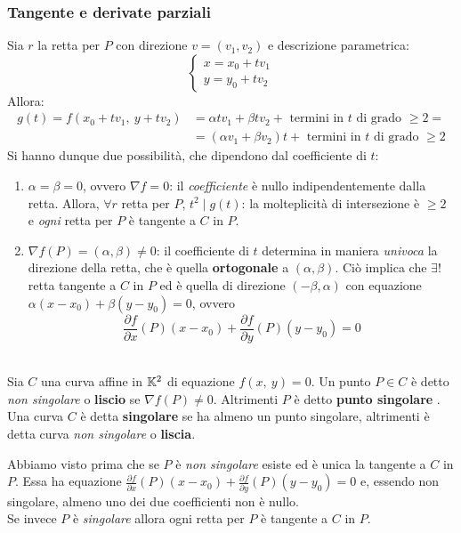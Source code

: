 \subsubsection{Tangente e derivate parziali}
Sia $r$ la retta per $P$ con direzione $v=(v_1,v_2)$ e descrizione parametrica:
\begin{equation*}
	\begin{cases}
		x=x_0+tv_1\\
		y=y_0+tv_2
	\end{cases}
\end{equation*}
Allora:
	\begin{equation*}
		\begin{array}{ll}
			g(t)=f(x_0+tv_1,\ y+tv_2)&=\alpha tv_1+\beta tv_2 + \text{ termini in }t\text{ di grado }\geq 2 =\\
			&= (\alpha v_1+\beta v_2)t + \text{ termini in }t \text{ di grado }\geq 2
		\end{array}	
	\end{equation*}
Si hanno dunque due possibilità, che dipendono dal coefficiente di $t$:
	\begin{enumerate}
		\item	$\alpha=\beta=0$, ovvero $\nabla f =0$: il \textit{coefficiente} è nullo indipendentemente dalla retta. Allora, $\forall r$ retta per $P$,  $t^2 \mid g(t)$: la molteplicità di intersezione è $\geq 2$ e \textit{ogni} retta per $P$ è tangente a $C$ in $P$.
		\item	$\nabla f\left(P\right)=(\alpha,\beta)\neq 0$:	il coefficiente di $t$ determina in maniera \textit{univoca} la direzione della retta, che è quella \textbf{ortogonale} a $(\alpha,\beta)$. Ciò implica che $\exists !$ retta tangente a $C$ in $P$ ed è quella di direzione $(-\beta,\alpha)$ con equazione	$\alpha(x-x_0)+\beta(y-y_0)=0$, ovvero
			\begin{equation}
				\frac{\partial{f}}{\partial{x}}\left(P\right)(x-x_0) + \frac{\partial{f}}{\partial{y}} \left(P\right)(y-y_0)=0
			\end{equation}
	\end{enumerate}
\begin{define}~{}\\
	Sia $C$ una curva affine in $\mathbb{K}^2$ di equazione $f\left(x,\ y\right)=0$. Un punto $P\in C$ è detto \textit{non singolare} o \textbf{liscio} se $\nabla f\left(P\right)\neq 0$. Altrimenti $P$ è detto \textbf{punto singolare} .\\
	Una curva $C$ è detta \textbf{singolare} se ha almeno un punto singolare, altrimenti è detta curva \textit{non singolare} o \textbf{liscia}.
\end{define}
Abbiamo visto prima che se $P$ è \textit{non singolare} esiste ed è unica la tangente a $C$ in $P$. Essa ha equazione	$\frac{\partial{f}}{\partial{x}}\left(P\right)(x-x_0) + \frac{\partial{f}}{\partial{y}} \left(P\right)(y-y_0)=0$ e, essendo non singolare, almeno uno dei due coefficienti non è nullo.\\
Se invece $P$ è \textit{singolare} allora ogni retta per $P$ è tangente a $C$ in $P$.
